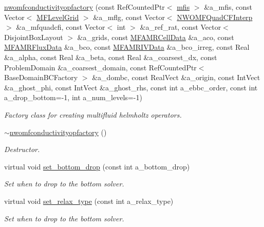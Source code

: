 \begin{DoxyCompactItemize}
\item 
\hyperlink{classnwomfconductivityopfactory_ad0f173cbb2106f2ca80dcdf099b5c3ef}{nwomfconductivityopfactory} (const Ref\+Counted\+Ptr$<$ \hyperlink{classmfis}{mfis} $>$ \&a\+\_\+mfis, const Vector$<$ \hyperlink{classMFLevelGrid}{M\+F\+Level\+Grid} $>$ \&a\+\_\+mflg, const Vector$<$ \hyperlink{classNWOMFQuadCFInterp}{N\+W\+O\+M\+F\+Quad\+C\+F\+Interp} $>$ \&a\+\_\+mfquadcfi, const Vector$<$ int $>$ \&a\+\_\+ref\+\_\+rat, const Vector$<$ Disjoint\+Box\+Layout $>$ \&a\+\_\+grids, const \hyperlink{type__definitions_8H_aced885351d40daa466564acbee4042d3}{M\+F\+A\+M\+R\+Cell\+Data} \&a\+\_\+aco, const \hyperlink{type__definitions_8H_a4033d82364b7e6655b58257749d7881f}{M\+F\+A\+M\+R\+Flux\+Data} \&a\+\_\+bco, const \hyperlink{type__definitions_8H_a559707b00625e419df1a59d9501220de}{M\+F\+A\+M\+R\+I\+V\+Data} \&a\+\_\+bco\+\_\+irreg, const Real \&a\+\_\+alpha, const Real \&a\+\_\+beta, const Real \&a\+\_\+coarsest\+\_\+dx, const Problem\+Domain \&a\+\_\+coarsest\+\_\+domain, const Ref\+Counted\+Ptr$<$ Base\+Domain\+B\+C\+Factory $>$ \&a\+\_\+dombc, const Real\+Vect \&a\+\_\+origin, const Int\+Vect \&a\+\_\+ghost\+\_\+phi, const Int\+Vect \&a\+\_\+ghost\+\_\+rhs, const int a\+\_\+ebbc\+\_\+order, const int a\+\_\+drop\+\_\+bottom=-\/1, int a\+\_\+num\+\_\+levels=-\/1)
\begin{DoxyCompactList}\small\item\em Factory class for creating multifluid helmholtz operators. \end{DoxyCompactList}\item 
\hyperlink{classnwomfconductivityopfactory_a46a3eed4abf31a63db6780a70ebc0e0e}{$\sim$nwomfconductivityopfactory} ()
\begin{DoxyCompactList}\small\item\em Destructor. \end{DoxyCompactList}\item 
virtual void \hyperlink{classnwomfconductivityopfactory_a898138b8dc5c825a3e647ef214925161}{set\+\_\+bottom\+\_\+drop} (const int a\+\_\+bottom\+\_\+drop)
\begin{DoxyCompactList}\small\item\em Set when to drop to the bottom solver. \end{DoxyCompactList}\item 
virtual void \hyperlink{classnwomfconductivityopfactory_ae30d81170d64b924c47f876c29b74e60}{set\+\_\+relax\+\_\+type} (const int a\+\_\+relax\+\_\+type)
\begin{DoxyCompactList}\small\item\em Set when to drop to the bottom solver. \end{DoxyCompactList}\item 

\end{DoxyCompactItemize}
